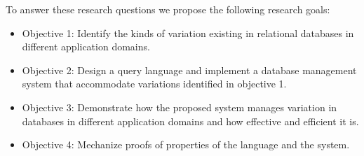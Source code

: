 To answer these research questions we propose the following research goals:

\begin{itemize}
\item Objective 1: Identify the kinds of variation existing in relational databases in 
different application domains.
\item Objective 2: Design a query language and implement a database management 
system that accommodate  variations identified in objective 1.
\item Objective 3: Demonstrate how the proposed system manages
variation in databases in different application domains and how effective and efficient it is.
\item Objective 4: Mechanize proofs of properties of the language and the system.
\end{itemize}


